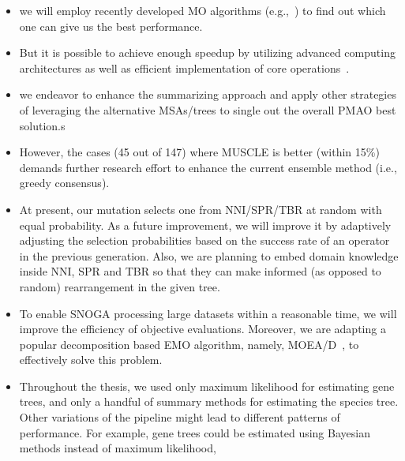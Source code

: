 \begin{itemize}
	\item we will employ recently developed MO algorithms (e.g.,~\cite{8981871, 9047876, 9097242}) to find out which one can give us the best performance.
	
	\item But it is possible to achieve enough speedup by utilizing advanced computing architectures as well as efficient implementation of core operations~\cite{8255834, 7738460}.  
	 
	\item we endeavor to enhance the summarizing approach and apply other strategies of leveraging the alternative MSAs/trees to single out the overall PMAO best solution.s
	
	\item However, the cases (45 out of 147) where MUSCLE is better (within 15\%) demands further research effort to enhance the current ensemble method (i.e., greedy consensus).
	
	\item At present, our mutation selects one from NNI/SPR/TBR at random with equal probability. As a future improvement, we will improve it by adaptively adjusting the selection probabilities based on the success rate of an operator in the previous generation. Also, we are planning to embed domain knowledge inside NNI, SPR and TBR so that they can make informed (as opposed to random) rearrangement in the given tree. 
	
	\item To enable SNOGA processing large datasets within a reasonable time, we will improve the efficiency of objective evaluations. Moreover, we are adapting a popular decomposition based EMO algorithm, namely, MOEA/D~\cite{zhang2007moea}, to effectively solve this problem.
	
	\item Throughout the
	thesis, we used only maximum likelihood for estimating gene trees, and only
	a handful of summary methods for estimating the species tree. Other variations of the pipeline might lead to different patterns of performance. For
	example, gene trees could be estimated using Bayesian methods instead of
	maximum likelihood, 
\end{itemize}


